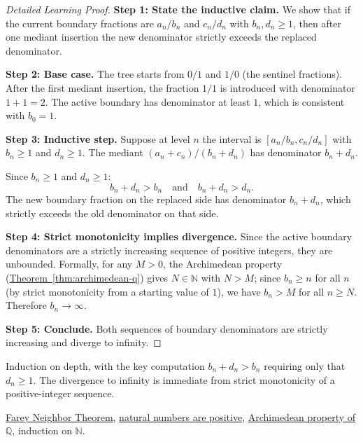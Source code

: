 \begin{proof}[Detailed Learning Proof]
\LRAProofBodyStart
\textbf{Step 1: State the inductive claim.}
We show that if the current boundary fractions are $a_n/b_n$ and
$c_n/d_n$ with $b_n, d_n \geq 1$, then after one mediant insertion the
new denominator strictly exceeds the replaced denominator.

\textbf{Step 2: Base case.}
The tree starts from $0/1$ and $1/0$ (the sentinel fractions).
After the first mediant insertion, the fraction $1/1$ is introduced with
denominator $1 + 1 = 2$.  The active boundary has denominator at least
$1$, which is consistent with $b_0 = 1$.

\textbf{Step 3: Inductive step.}
Suppose at level $n$ the interval is $[a_n/b_n, c_n/d_n]$ with
$b_n \geq 1$ and $d_n \geq 1$.  The mediant $(a_n + c_n)/(b_n + d_n)$
has denominator $b_n + d_n$.

Since $b_n \geq 1$ and $d_n \geq 1$:
\[
b_n + d_n > b_n \quad \text{and} \quad b_n + d_n > d_n.
\]
The new boundary fraction on the replaced side has denominator $b_n + d_n$,
which strictly exceeds the old denominator on that side.

\textbf{Step 4: Strict monotonicity implies divergence.}
Since the active boundary denominators are a strictly increasing sequence
of positive integers, they are unbounded.  Formally, for any $M > 0$,
the Archimedean property (\hyperref[thm:archimedean-q]{Theorem~\ref*{thm:archimedean-q}})
gives $N \in \mathbb{N}$ with $N > M$; since $b_n \geq n$ for all $n$
(by strict monotonicity from a starting value of $1$), we have
$b_n > M$ for all $n \geq N$.  Therefore $b_n \to \infty$.

\textbf{Step 5: Conclude.}
Both sequences of boundary denominators are strictly increasing and
diverge to infinity.
\end{proof}

\begin{remark*}
Induction on depth, with the key computation $b_n + d_n > b_n$ requiring
only that $d_n \geq 1$.  The divergence to infinity is immediate from
strict monotonicity of a positive-integer sequence.
\end{remark*}

\begin{dependencies}
\hyperref[thm:farey-neighbor-theorem]{Farey Neighbor Theorem},
\hyperref[cor:n-positive]{natural numbers are positive},
\hyperref[thm:archimedean-q]{Archimedean property of $\mathbb{Q}$},
induction on $\mathbb{N}$.
\end{dependencies}

\clearpage
